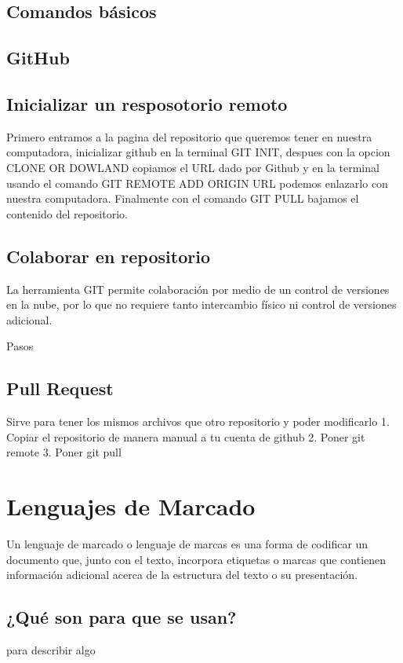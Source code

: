 \documentclass[11pt,letterpaper]{article}
\begin{document}
\subsection{Comandos básicos}

\subsection{GitHub}
\subsection{Inicializar un resposotorio remoto}

Primero entramos a la pagina del repositorio que queremos tener en nuestra computadora, inicializar github en la terminal GIT INIT, despues con la opcion CLONE OR DOWLAND copiamos el URL dado por Github y en la terminal usando el comando GIT REMOTE ADD ORIGIN URL podemos enlazarlo con nuestra computadora. Finalmente con el comando GIT PULL bajamos el contenido del repositorio.

\subsection{Colaborar en repositorio}
La herramienta GIT permite colaboración por medio de un control de versiones en la nube, por lo que no requiere tanto intercambio físico ni control de versiones adicional.

Pasos

\subsection{Pull Request}
Sirve para tener los mismos archivos que otro repositorio y poder modificarlo
1. Copiar el repositorio de manera manual a tu cuenta de github
2. Poner git remote
3. Poner git pull
\section{Lenguajes de Marcado}
Un lenguaje de marcado o lenguaje de marcas es una forma de codificar un documento que, junto con el texto, incorpora etiquetas o marcas que contienen información adicional acerca de la estructura del texto o su presentación.


\subsection{¿Qué son para que se usan?}
para describir algo 
\end{document}

